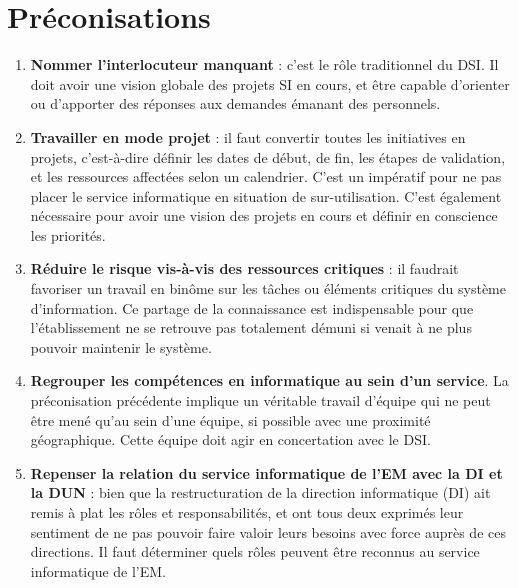 \documentclass{book}
\begin{document}
\section{Préconisations}

\begin{enumerate}
\item	\textbf{Nommer l'interlocuteur manquant} : c'est le rôle traditionnel du DSI. Il doit
avoir une vision globale des projets SI en cours, et être capable d'orienter ou 
d'apporter des réponses aux demandes émanant des personnels.\\

\item \textbf{Travailler en mode projet} : il faut convertir toutes les initiatives en projets,
c'est-à-dire définir les dates de début, de fin, les étapes de validation, et les ressources
affectées selon un calendrier. C'est un impératif pour ne pas placer le service informatique
en situation de sur-utilisation. C'est également nécessaire pour avoir une vision des projets
en cours et définir en conscience les priorités.\\

\item \textbf{Réduire le risque vis-à-vis des ressources critiques} : il faudrait favoriser
un travail en binôme sur les tâches ou éléments critiques du système d'information. Ce 
partage de la connaissance est indispensable pour que l'établissement ne se retrouve pas
totalement démuni si \CK venait à ne plus pouvoir maintenir le système.\\

\item \textbf{Regrouper les compétences en informatique au sein d'un service}. 
La préconisation précédente implique un véritable travail d'équipe qui ne peut être mené
qu'au sein d'une équipe, si possible avec une proximité géographique. Cette équipe
doit agir en concertation avec le DSI.\\

\item \textbf{Repenser la relation du service informatique de l'EM avec la DI et la DUN} :
bien que la restructuration de la direction informatique (DI) ait remis à plat
les rôles et responsabilités, \CK et \NB ont tous deux exprimés leur sentiment de
ne pas pouvoir faire valoir leurs besoins avec force auprès de ces directions.
Il faut déterminer quels rôles peuvent être reconnus au service informatique de l'EM.\\




\end{enumerate}
\end{document}
